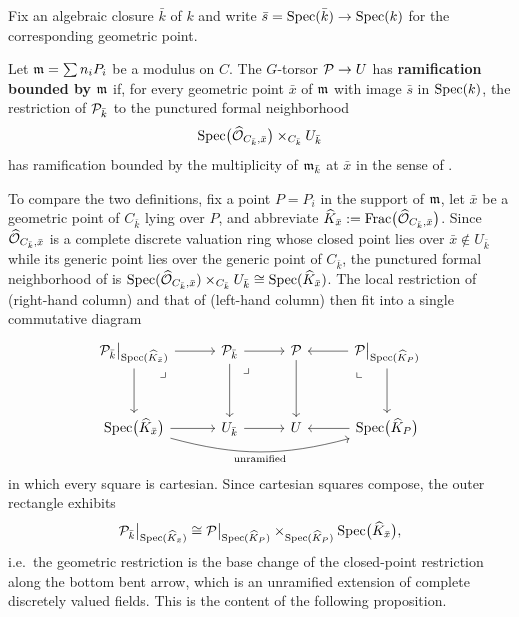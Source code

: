Fix an algebraic closure $\bar{k}$ of $k$ and write
$\bar{s}=\operatorname{Spec}(\bar{k})\to\operatorname{Spec}(k)$ for the corresponding geometric point.

\begin{definition}\label{definition:ramification_bounded_by_modulus_geometric}
    Let $\mathfrak{m} = \sum n_i P_i$ be a modulus on $C$.
    The $G$-torsor $\mathcal{P} \to U$ has \textbf{ramification bounded by $\mathfrak{m}$}
    if, for every geometric point $\bar{x}$ of $\mathfrak{m}$ with image $\bar{s}$ in $\operatorname{Spec}(k)$, the
    restriction of $\mathcal{P}_{\bar{k}}$ to the punctured formal neighborhood
    \[
        \operatorname{Spec}\bigl(\widehat{\mathcal{O}}_{C_{\bar{k}},\bar{x}}\bigr)
        \times_{C_{\bar{k}}} U_{\bar{k}}
    \]
    has ramification bounded by the multiplicity of $\mathfrak{m}_{\bar{k}}$ at $\bar{x}$ in the sense of
    .
\end{definition}

To compare the two definitions, fix a point $P=P_i$ in the support of $\mathfrak{m}$, let $\bar{x}$ be a geometric
point of $C_{\bar{k}}$ lying over $P$, and abbreviate
$\widehat{K}_{\bar{x}} := \operatorname{Frac}\bigl(\widehat{\mathcal{O}}_{C_{\bar{k}},\bar{x}}\bigr)$. Since
$\widehat{\mathcal{O}}_{C_{\bar{k}},\bar{x}}$ is a complete discrete valuation ring whose closed point lies over
$\bar{x} \notin U_{\bar{k}}$ while its generic point lies over the generic point of $C_{\bar{k}}$, the punctured formal
neighborhood of  is
$\operatorname{Spec}(\widehat{\mathcal{O}}_{C_{\bar{k}},\bar{x}}) \times_{C_{\bar{k}}} U_{\bar{k}} \cong \operatorname{Spec}(\widehat{K}_{\bar{x}})$.
The local restriction of  (right-hand column)
and that of  (left-hand column) then fit into a
single commutative diagram
\[
\begin{tikzcd}[column sep=2.9em, row sep=3.2em]
\cP_{\bar{k}}\big|_{\Spec(\widehat{K}_{\bar{x}})}
    \ar[r] \ar[d]
    \ar[dr, phantom, "\lrcorner", very near start]
& \cP_{\bar{k}}
    \ar[r] \ar[d]
    \ar[dr, phantom, "\lrcorner", very near start]
& \cP \ar[d]
& \cP\big|_{\Spec(\widehat{K}_{P})}
    \ar[l] \ar[d]
    \ar[dl, phantom, "\llcorner", very near start]
\\
\Spec\bigl(\widehat{K}_{\bar{x}}\bigr)
    \ar[r]
    \ar[rrr, bend right=15, "\text{unramified}"{below}]
& U_{\bar{k}}
    \ar[r]
& U
& \Spec\bigl(\widehat{K}_{P}\bigr)
    \ar[l]
\end{tikzcd}
\]
in which every square is cartesian. Since cartesian squares compose, the outer rectangle exhibits
\begin{equation}\label{eq:geometric_restriction_is_base_change}
    \mathcal{P}_{\bar{k}}\big|_{\operatorname{Spec}(\widehat{K}_{\bar{x}})}
    \cong
    \mathcal{P}\big|_{\operatorname{Spec}(\widehat{K}_{P})}
    \times_{\operatorname{Spec}(\widehat{K}_{P})} \operatorname{Spec}\bigl(\widehat{K}_{\bar{x}}\bigr),
\end{equation}
i.e.\ the geometric restriction is the base change of the closed-point restriction along the bottom bent
arrow, which is an unramified extension of complete discretely valued fields. This is the content of the
following proposition.

